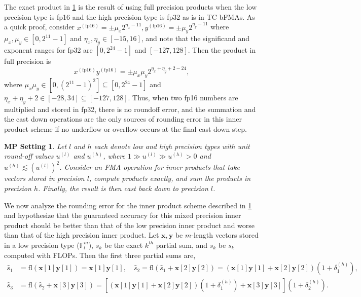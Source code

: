 \documentclass[review,onefignum,onetabnum]{siamart190516}
\newtheorem{assump}[theorem]{MP Setting}
\newcommand{\F}{\mathbb{F}}
\newcommand{\dd}{\delta}
\newcommand{\bb}[1]{\mathbf{#1}}
\newcommand{\fl}{\mathrm{fl}}
\begin{document}
The exact product in \cref{assump:mp} is the result of using full precision products when the low precision type is fp16 and the high precision type is fp32 as is in TC bFMAs.
As a quick proof, consider $x^{(\text{fp16})} = \pm\mu_x2^{\eta_x -11},y^{(\text{fp16})} = \pm\mu_y2^{\eta_y -11}$ where $\mu_x,\mu_y\in[0,2^{11}-1]$ and $\eta_x,\eta_y\in[-15,16]$, and note that the significand and exponent ranges for fp32 are $[0, 2^{24}-1]$ and $[-127,128]$.
Then the product in full precision is
\[x^{(\text{fp16})}y^{(\text{fp16})} = \pm\mu_x\mu_y 2^{\eta_x+\eta_y+2-24},\]
where  $\mu_x\mu_y \in[0,(2^{11}-1)^2] \subseteq [0,2^{24}-1]$ and $\eta_x+\eta_y +2\in[-28,34]\subseteq[-127,128]$.
Thus, when two fp16 numbers are multiplied and stored in fp32, there is no roundoff error, and the summation and the cast down operations are the only sources of rounding error in this inner product scheme if no underflow or overflow occurs at the final cast down step.
\begin{assump}
	\label{assump:mp}
	Let $l$ and $h$ each denote low and high precision types with unit round-off values $u^{(l)}$ and $u^{(h)}$, where $1 \gg u^{(l)} \gg u^{(h)} >0$ and $u^{(h)} \lesssim (u^{(l)})^2$.
	Consider an FMA operation for inner products that take vectors stored in precision $l$, compute products exactly, and sum the products in precision $h$. 
	Finally, the result is then cast back down to precision $l$.
\end{assump}
We now analyze the rounding error for the inner product scheme described in \cref{assump:mp} and hypothesize that the guaranteed accuracy for this mixed precision inner product should be better than that of the low precision inner product and worse than that of the high precision inner product.
Let $\bb{x},\bb{y}$ be $m$-length vectors stored in a low precision type ($\F_l^m$), $s_k$ be the exact $k^{th}$ partial sum, and $\hat{s}_k$ be $s_k$ computed with FLOPs.
Then the first three partial sums are,
\begin{align*}
\hat{s}_1 &= \fl (\bb{x}[1]\bb{y}[1]) = \bb{x}[1]\bb{y}[1],\quad \hat{s}_2 = \fl(\hat{s}_1 + \bb{x}[2]\bb{y}[2]) = \left(\bb{x}[1]\bb{y}[1]+ \bb{x}[2]\bb{y}[2]\right)(1+\dd_{1}^{(h)}),\\
\hat{s}_3 &= \fl(\hat{s}_2+\bb{x}[3]\bb{y}[3]) = \left[\left(\bb{x}[1]\bb{y}[1] + \bb{x}[2]\bb{y}[2]\right)(1+\dd_{1}^{(h)})  + \bb{x}[3]\bb{y}[3]\right](1+\dd_{2}^{(h)}).
\end{align*}
\end{document}
